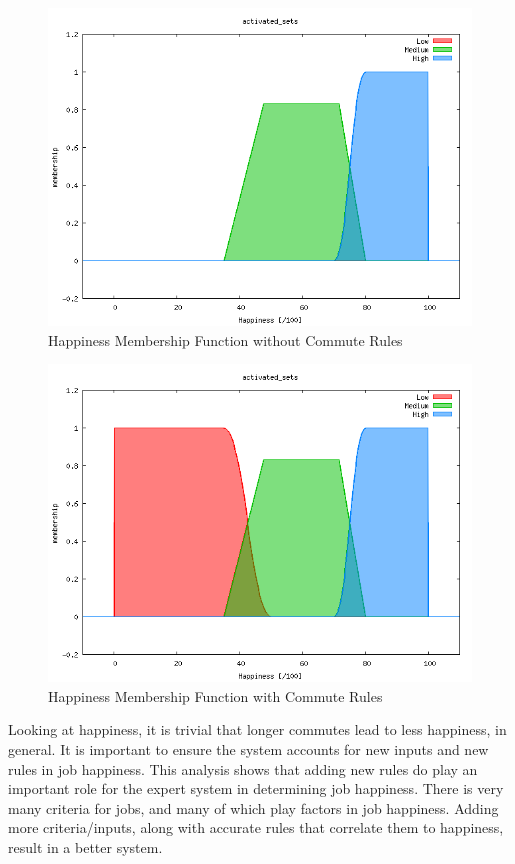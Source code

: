 \documentclass[12pt,fleqn,reqno,letterpaper]{article}
\begin{document}
\begin{figure}[H]
  \centering
  \includegraphics[scale=0.5,natwidth=640,natheight=480]{fig/NO_COMMUTE.png}
  \caption{Happiness Membership Function without Commute Rules}
  \label{fig:NO-COMMUTE}
\end{figure}
\begin{figure}[H]
  \centering
  \includegraphics[scale=0.5,natwidth=640,natheight=480]{fig/YES_COMMUTE.png}
  \caption{Happiness Membership Function with Commute Rules}
  \label{fig:YES-COMMUTE}
\end{figure}

Looking at happiness, it is trivial that longer commutes lead to less happiness, in general. It is important to ensure the system accounts for new inputs and new rules in job happiness. This analysis shows that adding new rules do play an important role for the expert system in determining job happiness. There is very many criteria for jobs, and many of which play factors in job happiness. Adding more criteria/inputs, along with accurate rules that correlate them to happiness, result in a better system.
\end{document}
